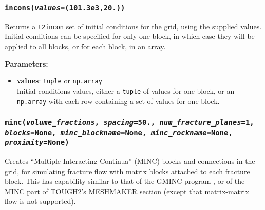 \begin{snugshade}
\subsubsection{\texttt{incons(\emph{values}=(101.3e3,20.))}}
\end{snugshade}
\label{sec:t2grid:incons}

Returns a \hyperref[incons]{\texttt{t2incon}} set of initial conditions for the grid, using the supplied values.  Initial conditions can be specified for only one block, in which case they will be applied to all blocks, or for each block, in an array.

\textbf{Parameters:}
\begin{itemize}
\item \textbf{values}: \texttt{tuple} or \texttt{np.array}\\
  Initial conditions values, either a \texttt{tuple} of values for one block, or an \texttt{np.array} with each row containing a set of values for one block. 
\end{itemize}

\begin{snugshade}
\subsubsection{\texttt{minc(\emph{volume\_fractions}, \emph{spacing}=50., \emph{num\_fracture\_planes}=1,\\
    \emph{blocks}=None, \emph{minc\_blockname}=None, \emph{minc\_rockname}=None,\\
    \emph{proximity}=None)}}
\end{snugshade}
\label{sec:t2grid:MINC}

Creates ``Multiple Interacting Continua'' (MINC) blocks and connections in the grid, for simulating fracture flow with matrix blocks attached to each fracture block. This has capability similar to that of the GMINC program \citep{GMINC}, or of the MINC part of TOUGH2's \hyperref[sec:t2data:meshmaker]{MESHMAKER} section (except that matrix-matrix flow is not supported).

